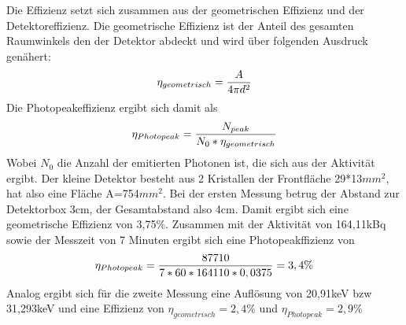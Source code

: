 \documentclass[a4paper,11pt,twoside]{article}
\begin{document}
Die Effizienz setzt sich zusammen aus der geometrischen Effizienz und der Detektoreffizienz. Die geometrische Effizienz ist der Anteil des gesamten Raumwinkels den der Detektor abdeckt und wird über folgenden Ausdruck genähert:
\begin{equation}
\eta_{geometrisch}={A\over 4 \pi d^2}
\end{equation}
Die Photopeakeffizienz ergibt sich damit als
\begin{equation}
\eta_{Photopeak}={N_{peak}\over N_0*\eta_{geometrisch}}
\end{equation}
Wobei $N_0$ die Anzahl der emitierten Photonen ist, die sich aus der Aktivität ergibt. Der kleine Detektor besteht aus 2 Kristallen der Frontfläche 29*13$mm^2$, hat also eine Fläche A=754$mm^2$. Bei der ersten Messung betrug der Abstand zur Detektorbox 3cm, der Gesamtabstand also 4cm. Damit ergibt sich eine geometrische Effizienz von 3,75\%. Zusammen mit der Aktivität von 164,11kBq sowie der Messzeit von 7 Minuten ergibt sich eine Photopeakffizienz von
\begin{equation}
\eta_{Photopeak}={87710\over 7*60*164110*0,0375}=3,4\%
\end{equation}
Analog ergibt sich für die zweite Messung eine Auflösung von 20,91keV bzw 31,293keV und eine Effizienz von $\eta_{geometrisch}=2,4\%$ und $\eta_{Photopeak}=2,9\%$



%
%
%
%


%
\end{document}
